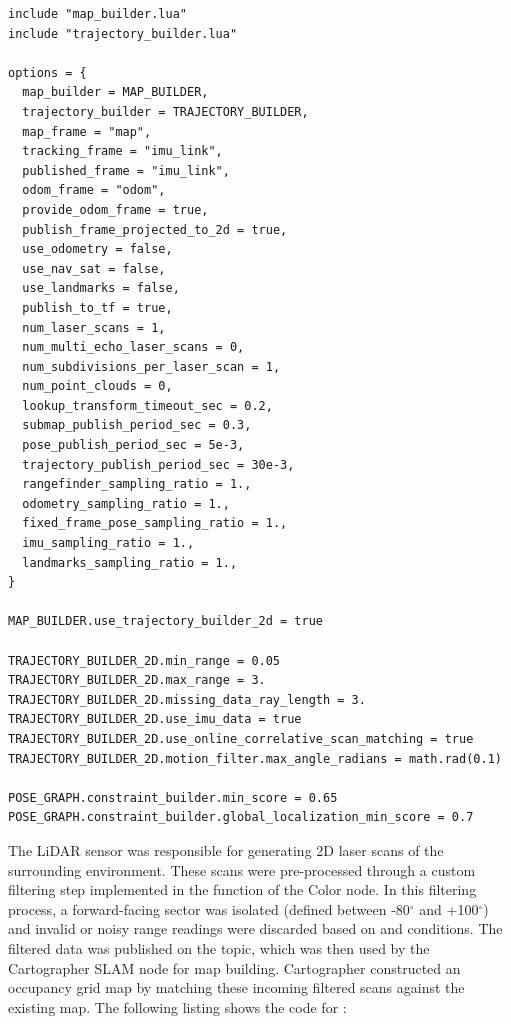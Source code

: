 \documentclass{article}
\begin{document}
\begin{lstlisting}
include "map_builder.lua" 
include "trajectory_builder.lua" 
 
options = { 
  map_builder = MAP_BUILDER, 
  trajectory_builder = TRAJECTORY_BUILDER, 
  map_frame = "map", 
  tracking_frame = "imu_link", 
  published_frame = "imu_link", 
  odom_frame = "odom", 
  provide_odom_frame = true,
  publish_frame_projected_to_2d = true, 
  use_odometry = false, 
  use_nav_sat = false, 
  use_landmarks = false, 
  publish_to_tf = true, 
  num_laser_scans = 1, 
  num_multi_echo_laser_scans = 0, 
  num_subdivisions_per_laser_scan = 1, 
  num_point_clouds = 0, 
  lookup_transform_timeout_sec = 0.2, 
  submap_publish_period_sec = 0.3, 
  pose_publish_period_sec = 5e-3, 
  trajectory_publish_period_sec = 30e-3, 
  rangefinder_sampling_ratio = 1., 
  odometry_sampling_ratio = 1., 
  fixed_frame_pose_sampling_ratio = 1., 
  imu_sampling_ratio = 1., 
  landmarks_sampling_ratio = 1., 
} 
 
MAP_BUILDER.use_trajectory_builder_2d = true 
 
TRAJECTORY_BUILDER_2D.min_range = 0.05 
TRAJECTORY_BUILDER_2D.max_range = 3. 
TRAJECTORY_BUILDER_2D.missing_data_ray_length = 3. 
TRAJECTORY_BUILDER_2D.use_imu_data = true  
TRAJECTORY_BUILDER_2D.use_online_correlative_scan_matching = true  
TRAJECTORY_BUILDER_2D.motion_filter.max_angle_radians = math.rad(0.1) 
 
POSE_GRAPH.constraint_builder.min_score = 0.65 
POSE_GRAPH.constraint_builder.global_localization_min_score = 0.7 
\end{lstlisting}

The LiDAR sensor was responsible for generating 2D laser scans of the surrounding environment. These scans were pre-processed through a custom filtering step implemented in the  function of the Color node. In this filtering process, a forward-facing sector was isolated (defined between -80$^{\circ}$ and +100$^{\circ}$) and invalid or noisy range readings were discarded based on  and  conditions. The filtered data was published on the  topic, which was then used by the Cartographer SLAM node for map building. Cartographer constructed an occupancy grid map by matching these incoming filtered scans against the existing map. The following listing shows the code for :
\end{document}
